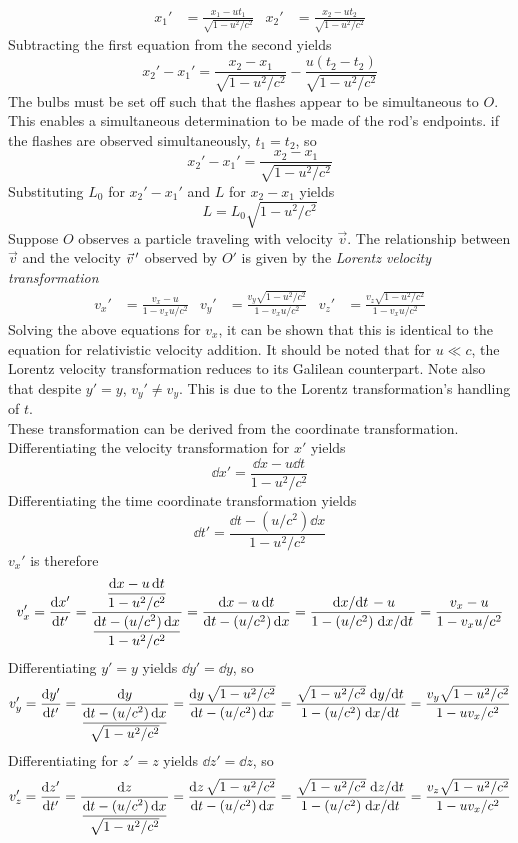 \documentclass{subfiles}
\begin{document}
				\begin{align*}
					x_1' &= \frac{x_1 - ut_1}{\sqrt{1 - u^2/c^2}} &
						x_2' &= \frac{x_2 - ut_2}{\sqrt{1 - u^2/c^2}}	
				\end{align*}
				Subtracting the first equation from the second yields
				\[x_2' - x_1' = \frac{x_2 - x_1}{\sqrt{1 - u^2/c^2}} - \frac{u(t_2 - t_2)}{\sqrt{1 - u^2/c^2}}\]
				The bulbs must be set off such that the flashes appear to be simultaneous to \(O\). This enables a simultaneous determination to be made of the rod's endpoints. if the flashes are observed simultaneously, \(t_1 = t_2\), so
				\[x_2' - x_1' = \frac{x_2 - x_1}{\sqrt{1 - u^2/c^2}}\]
				Substituting \(L_0\) for \(x_2' - x_1'\) and \(L\) for \(x_2 - x_1\) yields
				\[L = L_0\sqrt{1 - u^2/c^2}\]
			Suppose \(O\) observes a particle traveling with velocity \(\vec{v}\). The relationship between \(\vec{v}\) and the velocity \(\vec{v}\hspace{0.5mm}'\) observed by \(O'\) is given by the \textit{Lorentz velocity transformation}
				\begin{align*}
					v_x' &= \frac{v_x - u}{1 - v_xu/c^2} &
						v_y' &= \frac{v_y\sqrt{1 - u^2/c^2}}{1 - v_xu/c^2} &
						v_z' &= \frac{v_z\sqrt{1 - u^2/c^2}}{1 - v_xu/c^2}
							\tag{Lorentz velocity transformation}	
				\end{align*}
				Solving the above equations for \(v_x\), it can be shown that this is identical to the equation for relativistic velocity addition. It should be noted that for \(u \ll c\), the Lorentz velocity transformation reduces to its Galilean counterpart. Note also that despite \(y' = y\), \(v_y' \ne v_y\). This is due to the Lorentz transformation's handling of \(t\). \\
				These transformation can be derived from the coordinate transformation. 
				Differentiating the velocity transformation for \(x'\) yields
				\[\dd{x'} = \frac{\dd{x} - u\dd{t}}{1 - u^2/c^2}\]
				Differentiating the time coordinate transformation yields
				\[\dd{t'} = \frac{\dd{t} - \left(u/c^2\right)\dd{x}}{1 - u^2/c^2}\]
				\(v_x'\) is therefore
				\[
					v_x' = \dv{x'}{t'}
							= \frac{\dfrac{\dd{x} - u\dd{t}}{1 - u^2/c^2}}{\dfrac{\dd{t} - (u/c^2)\dd{x}}{1 - u^2/c^2}}
							= \frac{\dd{x} - u\dd{t}}{\dd{t} - (u/c^2)\dd{x}}
							= \frac{\dv*{x}{t} - u}{1 - (u/c^2)\dv*{x}{t}}
							= \frac{v_x - u}{1 - v_xu/c^2}	
				\]
				Differentiating \(y' = y\) yields \(\dd{y'} = \dd{y}\), so
				\[
					v_y' = \dv{y'}{t'}
							= \frac{\dd{y}}{\dfrac{\dd{t} - (u/c^2)\dd{x}}{\sqrt{1 - u^2/c^2}}}
							= \frac{\dd{y}\sqrt{1 - u^2/c^2}}{\dd{t} - (u/c^2)\dd{x}}
							= \frac{\sqrt{1 - u^2/c^2}\dv*{y}{t}}{1 - (u/c^2)\dv*{x}{t}}
							= \frac{v_y\sqrt{1 - u^2/c^2}}{1 - uv_x/c^2}
				\]
				Differentiating for \(z' = z\) yields \(\dd{z'} = \dd{z}\), so
				\[
					v_z' = \dv{z'}{t'}
							= \frac{\dd{z}}{\dfrac{\dd{t} - (u/c^2)\dd{x}}{\sqrt{1 - u^2/c^2}}}
							= \frac{\dd{z}\sqrt{1 - u^2/c^2}}{\dd{t} - (u/c^2)\dd{x}}
							= \frac{\sqrt{1 - u^2/c^2}\dv*{z}{t}}{1 - (u/c^2)\dv*{x}{t}}
							= \frac{v_z\sqrt{1 - u^2/c^2}}{1 - uv_x/c^2}
				\]
\end{document}
